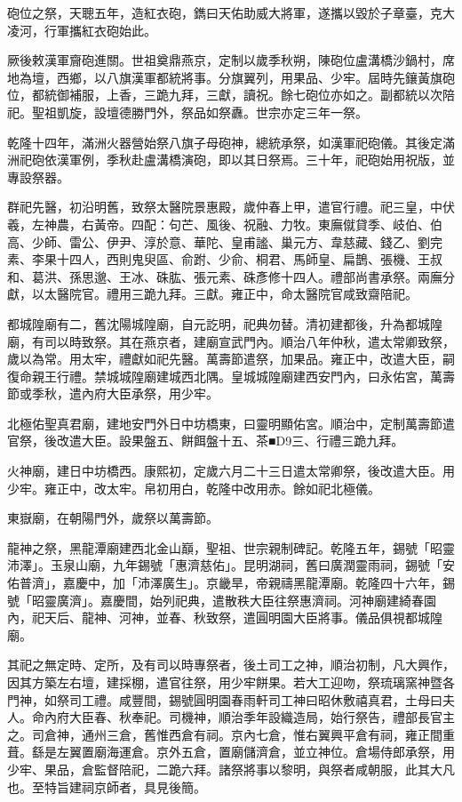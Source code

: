 \begin{pinyinscope}
砲位之祭，天聰五年，造紅衣砲，鐫曰天佑助威大將軍，遂攜以毀於子章臺，克大凌河，行軍攜紅衣砲始此。

厥後敕漢軍齎砲進關。世祖奠鼎燕京，定制以歲季秋朔，陳砲位盧溝橋沙鍋村，席地為壇，西鄉，以八旗漢軍都統將事。分旗翼列，用果品、少牢。屆時先鑲黃旗砲位，都統御補服，上香，三跪九拜，三獻，讀祝。餘七砲位亦如之。副都統以次陪祀。聖祖凱旋，設壇德勝門外，祭品如祭纛。世宗亦定三年一祭。

乾隆十四年，滿洲火器營始祭八旗子母砲神，總統承祭，如漢軍祀砲儀。其後定滿洲祀砲依漢軍例，季秋赴盧溝橋演砲，即以其日祭焉。三十年，祀砲始用祝版，並專設祭器。

群祀先醫，初沿明舊，致祭太醫院景惠殿，歲仲春上甲，遣官行禮。祀三皇，中伏羲，左神農，右黃帝。四配：句芒、風後、祝融、力牧。東廡僦貸季、岐伯、伯高、少師、雷公、伊尹、淳於意、華陀、皇甫謐、巢元方、韋慈藏、錢乙、劉完素、李果十四人，西則鬼臾區、俞跗、少俞、桐君、馬師皇、扁鵲、張機、王叔和、葛洪、孫思邈、王冰、硃肱、張元素、硃彥修十四人。禮部尚書承祭。兩廡分獻，以太醫院官。禮用三跪九拜。三獻。雍正中，命太醫院官咸致齋陪祀。

都城隍廟有二，舊沈陽城隍廟，自元訖明，祀典勿替。清初建都後，升為都城隍廟，有司以時致祭。其在燕京者，建廟宣武門內。順治八年仲秋，遣太常卿致祭，歲以為常。用太牢，禮獻如祀先醫。萬壽節遣祭，加果品。雍正中，改遣大臣，嗣復命親王行禮。禁城城隍廟建城西北隅。皇城城隍廟建西安門內，曰永佑宮，萬壽節或季秋，遣內府大臣承祭，用少牢。

北極佑聖真君廟，建地安門外日中坊橋東，曰靈明顯佑宮。順治中，定制萬壽節遣官祭，後改遣大臣。設果盤五、餅餌盤十五、茶■D9三、行禮三跪九拜。

火神廟，建日中坊橋西。康熙初，定歲六月二十三日遣太常卿祭，後改遣大臣。用少牢。雍正中，改太牢。帛初用白，乾隆中改用赤。餘如祀北極儀。

東嶽廟，在朝陽門外，歲祭以萬壽節。

龍神之祭，黑龍潭廟建西北金山巔，聖祖、世宗親制碑記。乾隆五年，錫號「昭靈沛澤」。玉泉山廟，九年錫號「惠濟慈佑」。昆明湖祠，舊曰廣潤靈雨祠，錫號「安佑普濟」，嘉慶中，加「沛澤廣生」。京畿旱，帝親禱黑龍潭廟。乾隆四十六年，錫號「昭靈廣濟」。嘉慶間，始列祀典，遣散秩大臣往祭惠濟祠。河神廟建綺春園內，祀天后、龍神、河神，並春、秋致祭，遣圓明園大臣將事。儀品俱視都城隍廟。

其祀之無定時、定所，及有司以時專祭者，後土司工之神，順治初制，凡大興作，因其方築左右壇，建採棚，遣官往祭，用少牢餅果。若大工迎吻，祭琉璃窯神暨各門神，如祭司工禮。咸豐間，錫號圓明園春雨軒司工神曰昭休敷禧真君，土母曰夫人。命內府大臣春、秋奉祀。司機神，順治季年設織造局，始行祭告，禮部長官主之。司倉神，通州三倉，舊惟西倉有祠。京內七倉，惟右翼興平倉有祠，雍正間重葺。繇是左翼置廟海運倉。京外五倉，置廟儲濟倉，並立神位。倉場侍郎承祭，用少牢、果品，倉監督陪祀，二跪六拜。諸祭將事以黎明，與祭者咸朝服，此其大凡也。至特旨建祠京師者，具見後簡。


\end{pinyinscope}
